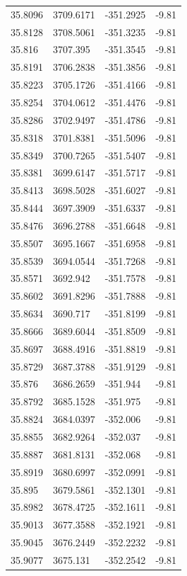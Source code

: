 \begin{table}[H]
\begin{tabular}{llll}
35.8096 & 3709.6171 & -351.2925 & -9.81 \\
35.8128 & 3708.5061 & -351.3235 & -9.81 \\
35.816 & 3707.395 & -351.3545 & -9.81 \\
35.8191 & 3706.2838 & -351.3856 & -9.81 \\
35.8223 & 3705.1726 & -351.4166 & -9.81 \\
35.8254 & 3704.0612 & -351.4476 & -9.81 \\
35.8286 & 3702.9497 & -351.4786 & -9.81 \\
35.8318 & 3701.8381 & -351.5096 & -9.81 \\
35.8349 & 3700.7265 & -351.5407 & -9.81 \\
35.8381 & 3699.6147 & -351.5717 & -9.81 \\
35.8413 & 3698.5028 & -351.6027 & -9.81 \\
35.8444 & 3697.3909 & -351.6337 & -9.81 \\
35.8476 & 3696.2788 & -351.6648 & -9.81 \\
35.8507 & 3695.1667 & -351.6958 & -9.81 \\
35.8539 & 3694.0544 & -351.7268 & -9.81 \\
35.8571 & 3692.942 & -351.7578 & -9.81 \\
35.8602 & 3691.8296 & -351.7888 & -9.81 \\
35.8634 & 3690.717 & -351.8199 & -9.81 \\
35.8666 & 3689.6044 & -351.8509 & -9.81 \\
35.8697 & 3688.4916 & -351.8819 & -9.81 \\
35.8729 & 3687.3788 & -351.9129 & -9.81 \\
35.876 & 3686.2659 & -351.944 & -9.81 \\
35.8792 & 3685.1528 & -351.975 & -9.81 \\
35.8824 & 3684.0397 & -352.006 & -9.81 \\
35.8855 & 3682.9264 & -352.037 & -9.81 \\
35.8887 & 3681.8131 & -352.068 & -9.81 \\
35.8919 & 3680.6997 & -352.0991 & -9.81 \\
35.895 & 3679.5861 & -352.1301 & -9.81 \\
35.8982 & 3678.4725 & -352.1611 & -9.81 \\
35.9013 & 3677.3588 & -352.1921 & -9.81 \\
35.9045 & 3676.2449 & -352.2232 & -9.81 \\
35.9077 & 3675.131 & -352.2542 & -9.81 \\

\end{tabular}
\end{table}
